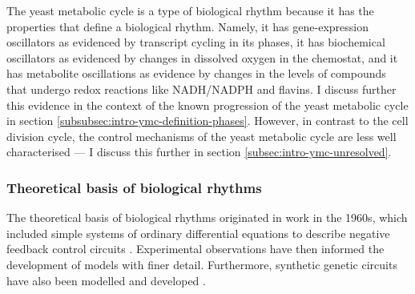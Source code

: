 The yeast metabolic cycle is a type of biological rhythm because it has the properties that define a biological rhythm.
Namely, it has gene-expression oscillators as evidenced by transcript cycling in its phases,
it has biochemical oscillators as evidenced by changes in dissolved oxygen in the chemostat,
and it has metabolite oscillations as evidence by changes in the levels of compounds that undergo redox reactions like NADH/NADPH and flavins.
I discuss further this evidence in the context of the known progression of the yeast metabolic cycle in section \ref{subsubsec:intro-ymc-definition-phases}.
However, in contrast to the cell division cycle, the control mechanisms of the yeast metabolic cycle are less well characterised --- I discuss this further in section \ref{subsec:intro-ymc-unresolved}.

\subsubsection{Theoretical basis of biological rhythms}
\label{subsubsec:intro-ymc-biological_rhythms-theoretical_basis}

The theoretical basis of biological rhythms originated in work in the 1960s, which included simple systems of ordinary differential equations to describe negative feedback control circuits \citep{goodwinOscillatoryBehaviorEnzymatic1965, griffithMathematicsCellularControl1968}.
Experimental observations have then informed the development of models with finer detail.
Furthermore, synthetic genetic circuits have also been modelled and developed \citep{elowitzSyntheticOscillatoryNetwork2000}.

